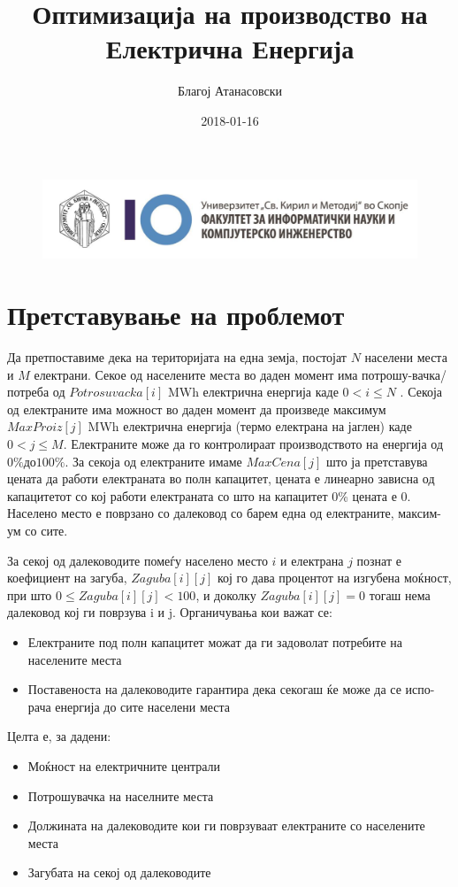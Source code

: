 \documentclass{article}
\title{Оптимизација на производство на Електрична Енергија}
\date{2018-01-16}
\author{Благој Атанасовски}
\begin{document}
\begin{figure}
\includegraphics[scale=.4]{image}
\end{figure}

\maketitle
\newpage

\section{Претставување на проблемот}
Да претпоставиме дека на територијата на една земја, постојат $N$ населени места и $M$ електрани. Секое од населените места во даден момент има потрошу-вачка/потреба од $ Potrosuvacka[i] $ MWh електрична енергија каде $ 0 < i \leq N $ . Секоја од електраните има можност во даден момент да произведе максимум $MaxProiz[j]$ MWh електрична енергија (термо електрана на јаглен) каде $0 < j \leq M$. Електраните може да го контролираат производството на енергија од $0\% до 100\%$. За секоја од електраните имаме $MaxCena[j]$ што ја претставува цената да работи електраната во полн капацитет, цената е линеарно зависна од капацитетот со кој работи електраната со што на капацитет 0\% цената е 0. Населено место е поврзано со далековод со барем една од електраните, максим-ум со сите. 

За секој од далеководите помеѓу населено место $i$ и електрана $j$ познат е коефициент на загуба, $Zaguba[i][j]$ кој го дава процентот на изгубена моќност, при што $0 \leq Zaguba[i][j] < 100 $, и доколку $Zaguba[i][j] = 0$ тогаш нема далековод кој ги поврзува i и j. Органичувања кои важат се:
\begin{itemize}
\item Електраните под полн капацитет можат да ги задоволат потребите на населените места
\item Поставеноста на далеководите гарантира дека секогаш ќе може да се испо-рача енергија до сите населени места
\end{itemize}

Целта е, за дадени:
\begin{itemize}
\item Моќност на електричните централи
\item Потрошувачка на населните места
\item Должината на далеководите кои ги поврзуваат електраните со населените места
\item Загубата на секој од далеководите
\end{itemize}
\end{document}
